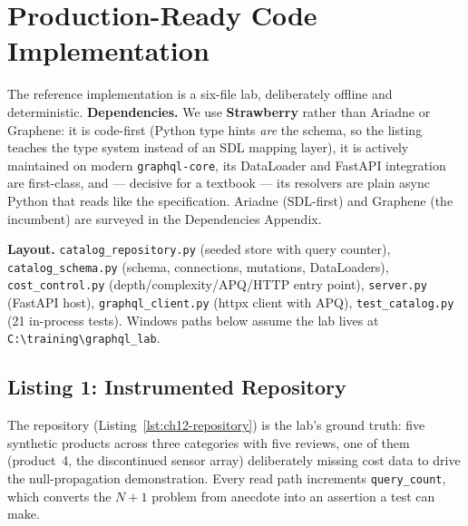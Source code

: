 \section{Production-Ready Code Implementation}
\label{sec:ch12-code}

The reference implementation is a six-file lab, deliberately offline and
deterministic. \textbf{Dependencies.} We use
\textbf{Strawberry} rather than Ariadne or Graphene: it is code-first
(Python type hints \emph{are} the schema, so the listing teaches the type
system instead of an SDL mapping layer), it is actively maintained on
modern \texttt{graphql-core}, its DataLoader and FastAPI integration are
first-class, and --- decisive for a textbook --- its resolvers are plain
async Python that reads like the specification. Ariadne (SDL-first) and
Graphene (the incumbent) are surveyed in the Dependencies Appendix.

\textbf{Layout.} \texttt{catalog\_repository.py} (seeded store with query
counter), \texttt{catalog\_schema.py} (schema, connections, mutations,
DataLoaders), \texttt{cost\_control.py} (depth/complexity/APQ/HTTP entry
point), \texttt{server.py} (FastAPI host), \texttt{graphql\_client.py}
(httpx client with APQ), \texttt{test\_catalog.py} (21 in-process tests).
Windows paths below assume the lab lives at
\texttt{C:\textbackslash{}training\textbackslash{}graphql\_lab}.

\subsection{Listing 1: Instrumented Repository}
\label{subsec:ch12-code-repository}

The repository (Listing~\ref{lst:ch12-repository}) is the lab's ground
truth: five synthetic products across three categories with five reviews,
one of them (product~4, the discontinued sensor array) deliberately missing
cost data to drive the null-propagation demonstration. Every read path
increments \texttt{query\_count}, which converts the $N{+}1$ problem from
anecdote into an assertion a test can make.

